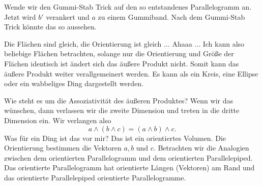 \documentclass[fleqn]{scrartcl}
\numberwithin{equation}{section}
\begin{document}
Wende wir den Gummi-Stab Trick auf den so entstandenes Parallelogramm an.
Jetzt wird $b'$ verankert und $a$ zu einem Gummiband. Nach dem Gummi-Stab
Trick könnte das so aussehen.
\begin{center}
\begin{minipage}{\linewidth}
\centering
{}
\label{fig:shiftshift}
\end{minipage}
\end{center}

Die Flächen sind gleich, die Orientierung ist gleich ... Ahaaa ... Ich kann
also beliebige Flächen betrachten, solange nur die Orientierung und Größe der
Flächen identisch ist ändert sich das äußere Produkt nicht. Somit kann das
äußere Produkt weiter verallgemeinert werden. Es kann als ein Kreis, eine
Ellipse oder ein wabbeliges Ding dargestellt werden.

Wie steht es um die Assoziativität des äußeren Produktes? Wenn wir das
wünschen, dann verlassen wir die zweite Dimension und treten in die dritte
Dimension ein. Wir verlangen also
\[a\wedge(b\wedge c) =(a\wedge b)\wedge c.\]
Was für ein Ding ist das vor mir? Das ist ein orientiertes Volumen. Die
Orientierung bestimmen die Vektoren $a, b$ und $c$. Betrachten wir die
Analogien zwischen dem orientierten Parallelogramm und dem orientierten
Parallelepiped. Das orientierte Parallelogramm hat orientierte Längen
(Vektoren) am Rand und das orientierte Parallelepiped orientierte
Parallelogramme.
\end{document}
